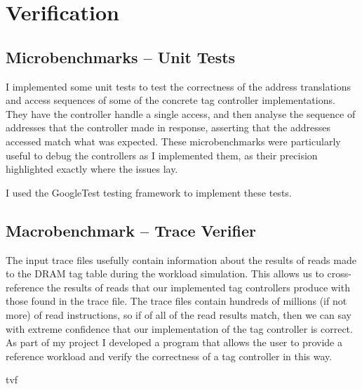 \section{Verification}

\subsection{Microbenchmarks -- Unit Tests}
I implemented some unit tests to test the correctness of the address translations and access sequences of some of the concrete tag controller implementations. They have the controller handle a single access, and then analyse the sequence of addresses that the controller made in response, asserting that the addresses accessed match what was expected. These microbenchmarks were particularly useful to debug the controllers as I implemented them, as their precision highlighted exactly where the issues lay.

I used the GoogleTest testing framework to implement these tests.

\subsection{Macrobenchmark -- Trace Verifier}
The input trace files usefully contain information about the results of reads made to the DRAM tag table during the workload simulation. This allows us to cross-reference the results of reads that our implemented tag controllers produce with those found in the trace file. The trace files contain hundreds of millions (if not more) of read instructions, so if of all of the read results match, then we can say with extreme confidence that our implementation of the tag controller is correct. As part of my project I developed a program that allows the user to provide a reference workload and verify the correctness of a tag controller in this way.

\begin{algorithm}[H]
	\centering
	{tvf}
	\caption{\texttt{verify.cpp}'s \texttt{verify} function}
	\label{code:tvf}
\end{algorithm}

